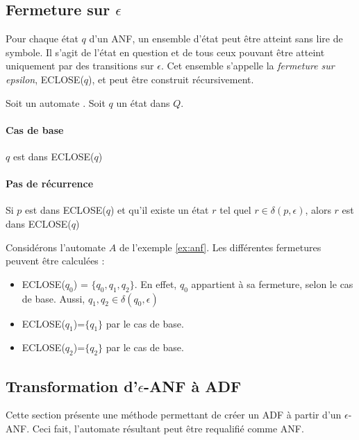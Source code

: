 \subsection{Fermeture sur $\epsilon$}

Pour chaque état $q$ d'un ANF, un ensemble d'état peut être atteint sans lire de symbole. Il s'agit de l'état en question et de tous ceux pouvant être atteint uniquement par des transitions sur $\epsilon$. Cet ensemble s'appelle la \emph{fermeture sur epsilon}, ECLOSE($q$), et peut être construit récursivement.

Soit un automate \automaton. Soit $q$ un état dans $Q$.

\paragraph{Cas de base} $q$ est dans ECLOSE($q$)

\paragraph{Pas de récurrence} Si $p$ est dans ECLOSE($q$) et qu'il existe un état $r$ tel quel $r\in\delta(p,\epsilon)$, alors $r$ est dans ECLOSE($q$)

\begin{exemple}\label{ex:anfclosure} Considérons l'automate $A$ de l'exemple \ref{ex:anf}. Les différentes fermetures peuvent être calculées :
	\begin{itemize}
		\item ECLOSE($q_0$) = $\{q_0,q_1,q_2\}$. En effet, $q_0$ appartient à sa fermeture, selon le cas de base. Aussi, $q_1,q_2\in\delta(q_0, \epsilon)$
		\item ECLOSE($q_1$)=$\{q_1\}$ par le cas de base.
		\item ECLOSE($q_2$)=$\{q_2\}$ par le cas de base.
	\end{itemize}
\end{exemple}



\subsection{Transformation d'$\epsilon$-ANF à ADF}\label{ss:eanfadf}

Cette section présente une méthode permettant de créer un ADF à partir d'un $\epsilon$-ANF. Ceci fait, l'automate résultant peut être requalifié comme ANF.

